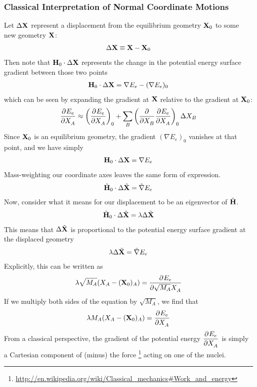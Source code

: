 \documentclass[11pt]{article}
\begin{document}
\subsubsection{Classical Interpretation of Normal Coordinate Motions}
Let $\Delta\mathbf{X}$ represent a displacement from the equilibrium geometry $\mathbf{X}_0$ to some new geometry $\mathbf{X}$:
\begin{align}
	\Delta\mathbf{X}
\equiv
	\mathbf{X}-\mathbf{X}_0
\end{align}
Then note that $\mathbf{H}_0\cdot\Delta\mathbf{X}$ represents the change in the potential energy surface gradient between those two points
\begin{align*}
%
	\bo{H}_0\cdot\D\bo{X}
=
%
	\nabla E_e
-
	(\nabla E_e)_0
\end{align*}
which can be seen by expanding the gradient at $\mathbf{X}$ relative to the gradient at $\mathbf{X}_0$:
\begin{align}
%
	\pd{}{E_e}{X_A}
\approx
%
	\pr{\pd{}{E_e}{X_A}}_0
+\sum_B
	\pr{\pd{}{}{X_B}\pd{}{E_e}{X_A}}_0
	\D X_B
\end{align}
Since $\mathbf{X}_0$ is an equilibrium geometry, the gradient $(\nabla E_e)_0$ vanishes at that point, and we have simply
\begin{align*}
%
	\bo{H}_0\cdot\D\bo{X}
=
%
	\nabla E_e
\end{align*}
Mass-weighting our coordinate axes leaves the same form of expression.
\begin{align*}
%
	\tl{\bo{H}}_0\cdot\D\tl{\bo{X}}
=
%
	\tl\nabla E_e
\end{align*}
Now, consider what it means for our displacement to be an eigenvector of $\tilde{\mathbf{H}}$.
\begin{align}
%
	\tl{\bo{H}}_0\cdot\D\tl{\bo{X}}
=
%
	\la \D\tl{\bo{X}}
\end{align}
This means that $\Delta\tilde{\mathbf{X}}$ is proportional to the potential energy surface gradient at the displaced geometry
\begin{align*}
%
	\la
	\D\tl{\bo{X}}
=
%
	\tl{\nabla}E_e
\end{align*}
Explicitly, this can be written as
\begin{align*}
%
	\la
	\sqrt{M_A}
	(X_A-(\bo{X}_0)_A)
=
%
	\pd{}{E_e}{\sqrt{M_A}X_A}
\end{align*}
If we multiply both sides of the equation by $\sqrt{M_A}$, we find that
\begin{align}
%
	\la
	M_A
	(X_A-(\bo{X}_0)_A)
=
%
	\pd{}{E_e}{X_A}
\end{align}
From a classical perspective, the gradient of the potential energy {\small $ \dfrac{ \partial^{} E_e }{\partial X_A ^{}}$} is simply a Cartesian component of (minus) the force \footnote{\url{http://en.wikipedia.org/wiki/Classical_mechanics\#Work_and_energy}} acting on one of the nuclei.
\end{document}
